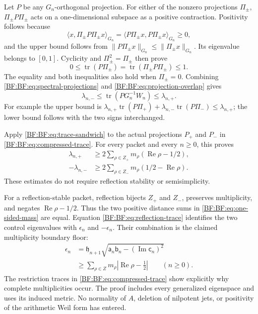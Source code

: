 Let \(P\) be any \(G_n\)-orthogonal projection.
For either of the nonzero projections \(\Pi_\pm\),
\(\Pi_\pm P\Pi_\pm\) acts on a one-dimensional subspace as a
positive contraction.  Positivity follows because
\[
\langle x,\Pi_\pm P\Pi_\pm x\rangle_{G_n}
=\langle P\Pi_\pm x,P\Pi_\pm x\rangle_{G_n}\ge0,
\]
and the upper bound follows from
\(\|P\Pi_\pm x\|_{G_n}\le\|\Pi_\pm x\|_{G_n}\).
Its eigenvalue belongs to \([0,1]\).
Cyclicity and \(\Pi_\pm^2=\Pi_\pm\) then prove
\begin{equation}
0\le\operatorname{tr}(P\Pi_\pm)
 =\operatorname{tr}(\Pi_\pm P\Pi_\pm)\le1.
\tag{BF.33}\label{BF:BF:eq:projection-overlap}
\end{equation}
The equality and both inequalities also hold when \(\Pi_\pm=0\).
Combining \eqref{BF:BF:eq:spectral-projections} and
\eqref{BF:BF:eq:projection-overlap} gives
\begin{equation}
\lambda_{n,-}
\le\operatorname{tr}(P G_n^{-1}W_n)
\le\lambda_{n,+}.
\tag{BF.34}\label{BF:BF:eq:trace-sandwich}
\end{equation}
For example the upper bound is
\(\lambda_{n,+}\operatorname{tr}(P\Pi_+)
+\lambda_{n,-}\operatorname{tr}(P\Pi_-)\le\lambda_{n,+}\);
the lower bound follows with the two signs interchanged.

Apply \eqref{BF:BF:eq:trace-sandwich} to the actual projections
\(P_+\) and \(P_-\) in \eqref{BF:BF:eq:compressed-trace}.
For every packet and every \(n\ge0\), this proves
\begin{equation}
\boxed{\begin{aligned}
\lambda_{n,+}
 &\ge2\sum_{\rho\in Z_+}
          m_\rho(\operatorname{Re}\rho-1/2),\\
-\lambda_{n,-}
 &\ge2\sum_{\rho\in Z_-}
          m_\rho(1/2-\operatorname{Re}\rho).
\end{aligned}}
\tag{BF.35}\label{BF:BF:eq:one-sided-mass}
\end{equation}
These estimates do not require reflection stability or
semisimplicity.

For a reflection-stable packet, reflection bijects \(Z_+\) and
\(Z_-\), preserves multiplicity, and negates
\(\operatorname{Re}\rho-1/2\).  Thus the two positive distance
sums in \eqref{BF:BF:eq:one-sided-mass} are equal.
Equation \eqref{BF:BF:eq:reflection-trace} identifies the two control
eigenvalues with \(\epsilon_n\) and \(-\epsilon_n\).
Their combination is the claimed multiplicity boundary floor:
\begin{equation}
\boxed{\begin{aligned}
\epsilon_n
 &=\mathfrak h_{n+1}
   \sqrt{\mathsf a_n\mathsf b_n-
                 (\operatorname{Im}\mathsf c_n)^2}\\
 &\ge\sum_{\rho\in Z}m_\rho
               \left|\operatorname{Re}\rho-\frac12\right|
 \qquad(n\ge0).
\end{aligned}}
\tag{BF.36}\label{BF:BF:eq:boundary-floor}
\end{equation}
The restriction traces in \eqref{BF:BF:eq:compressed-trace} show
explicitly why complete multiplicities occur.  The proof includes
every generalized eigenspace and uses its induced metric.  No
normality of \(A\), deletion of nilpotent jets, or positivity of
the arithmetic Weil form has entered.

